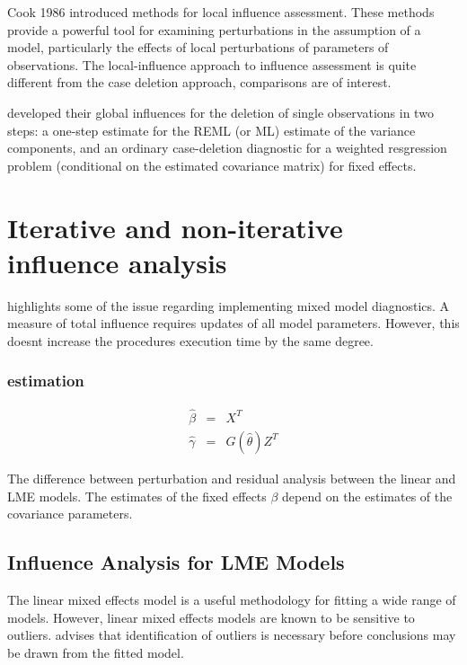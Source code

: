 \documentclass[12pt, a4paper]{report}
\theoremstyle{plain}
\theoremstyle{definition}
\theoremstyle{remark}
\begin{document}
Cook 1986 introduced methods for local influence assessment. These methods provide a powerful tool for examining perturbations in the assumption of a model, particularly the effects of local perturbations of parameters of observations. The local-influence approach to influence assessment is quite different from the case deletion approach, comparisons are of interest.

\citet{Christensen} developed their global influences for the deletion of single observations in two steps: a one-step estimate for the REML (or ML) estimate of the variance components, and an ordinary case-deletion diagnostic for a weighted resgression problem (conditional on the estimated covariance matrix) for fixed effects.









	\section{Iterative and non-iterative influence analysis}
	\citet{schabenberger} highlights some of the issue regarding implementing mixed model diagnostics.
	A measure of total influence requires updates of all model parameters.
	However, this doesnt increase the procedures execution time by the same degree.
	
	\subsubsection{estimation}
	
	\begin{eqnarray}
	\hat{\beta} &=& X^{T} \\
	\hat{\gamma} &=& G(\hat{\theta})Z^{T}
	\end{eqnarray}
	
	The difference between perturbation and residual analysis between the linear and LME models.
	The estimates of the fixed effects $\beta$ depend on the estimates of the covariance parameters.
	
	
	
	
\subsection{Influence Analysis for LME Models} %
The linear mixed effects model is a useful methodology for fitting a wide range of models. However, linear mixed effects models are known to be sensitive to outliers. \citet{CPJ} advises that identification of outliers is necessary before conclusions may be drawn from the fitted model.
\end{document}
